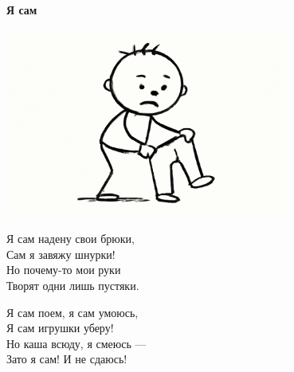 \vspace*{\fill}
\begin{center}
  {\huge\textbf{Я сам}}

  \vspace{1.5em}  \includegraphics[width=0.7\textwidth]{pictures/ya_sam.png}
  \vspace{4em}
  \parbox{0.6\textwidth}{
    \LARGE
    \begin{spacing}{1.2}
      Я сам надену свои брюки,\\
      Сам я завяжу шнурки!\\
      Но почему-то мои руки\\
      Творят одни лишь пустяки. \\

      \vspace{1em}

      Я сам поем, я сам умоюсь,\\
      Я сам игрушки уберу!\\
      Но каша всюду, я смеюсь —\\
      Зато я сам! И не сдаюсь! %
    \end{spacing}
      
  }
\end{center}
\vspace*{\fill}